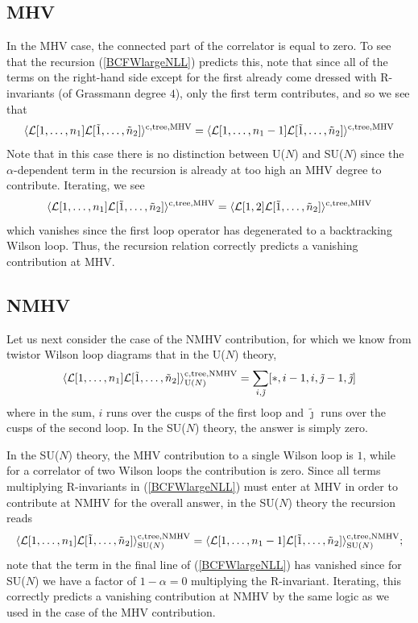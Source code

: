 \documentclass[12pt]{article}
\numberwithin{equation}{section}
\begin{document}
\subsection{MHV}
In the MHV case, the connected part of the correlator is equal to zero. To see that the recursion (\ref{BCFWlargeNLL}) predicts this, note that since all of the terms on the right-hand side except for the first already come dressed with R-invariants (of Grassmann degree \(4\)), only the first term contributes, and so we see that
\begin{equation}
\langle \mathcal{L}[1,\ldots,n_1]\mathcal{L}[\tilde{1},\ldots,\tilde{n}_2]\rangle^{\rm c, tree, MHV} = \langle \mathcal{L}[1,\ldots,n_1-1]\mathcal{L}[\tilde{1},\ldots,\tilde{n}_2]\rangle^{\rm c, tree, MHV}
\end{equation}
Note that in this case there is no distinction between U($N$) and SU($N$) since the \(\alpha\)-dependent term in the recursion is already at too high an MHV degree to contribute. Iterating, we see
\begin{equation}
\langle \mathcal{L}[1,\ldots,n_1]\mathcal{L}[\tilde{1},\ldots,\tilde{n}_2]\rangle^{\rm c, tree, MHV} = \langle \mathcal{L}[1,2]\mathcal{L}[\tilde{1},\ldots,\tilde{n}_2]\rangle^{\rm c, tree, MHV}
\end{equation}
which vanishes since the first loop operator has degenerated to a backtracking Wilson loop. Thus, the recursion relation correctly predicts a vanishing contribution at MHV.

\subsection{NMHV}
Let us next consider the case of the NMHV contribution, for which we know from twistor Wilson loop diagrams that in the U($N$) theory, 
\begin{equation}
\langle \mathcal{L}[1,\ldots,n_1] \mathcal{L}[\tilde{1},\ldots,\tilde{n}_2] \rangle^{\rm c, tree, NMHV}_{{\rm U}(N)} = \sum_{i,\tilde{\jmath}}[*,i-1,i,\tilde{\jmath}-1,\tilde{\jmath}]
\label{NMHVUN}
\end{equation}
where in the sum, \(i\) runs over the cusps of the first loop and \(\tilde{\jmath}\) runs over the cusps of the second loop. In the SU($N$) theory, the answer is simply zero. 

In the SU($N$) theory, the MHV contribution to a single Wilson loop is \(1\), while for a correlator of two Wilson loops the contribution is zero. Since all terms multiplying R-invariants in (\ref{BCFWlargeNLL}) must enter at MHV in order to contribute at NMHV for the overall answer, in the SU($N$) theory the recursion reads
\begin{equation}
\langle \mathcal{L}[1,\ldots,n_1] \mathcal{L}[\tilde{1},\ldots,\tilde{n}_2] \rangle^{\rm c, tree,NMHV}_{{\rm SU}(N)} = \langle \mathcal{L}[1,\ldots,n_1-1] \mathcal{L}[\tilde{1},\ldots,\tilde{n}_2] \rangle^{\rm c, tree,NMHV}_{{\rm SU} (N)};
\end{equation}
note that the term in the final line of (\ref{BCFWlargeNLL}) has vanished since for SU($N$) we have a factor of \(1-\alpha = 0\) multiplying the R-invariant. Iterating, this correctly predicts a vanishing contribution at NMHV by the same logic as we used in the case of the MHV contribution. 
\end{document}

